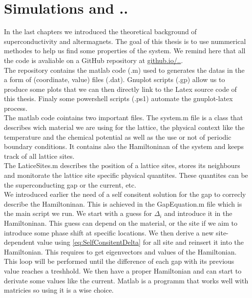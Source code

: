 \documentclass[../main.tex]{subfile}
\begin{document}
\section{Simulations and ..}
In the last chapters we introduced the theoretical background of superconductivity and altermagnets. 
The goal of this thesis is to use nummerical methodes to help us find some properties of the system.
We remind here that all the code is avaliable on a GitHub repository at \url{github.io/..}. \\

The repository contains the matlab code (.m) used to generates the datas in the a form of (coordinate, value) files (.dat).
Gnuplot scripts (.gp) allow us to produce some plots that we can then directly link to the Latex source code
of this thesis. Finaly some powershell scripts (.ps1) automate the gnuplot-latex process.\\

The matlab code cointains two important files. The system.m file is a class that describes wich
 material we are using for the lattice, the physical context like the temperature and the chemical potential
as well as the use or not of periodic boundary conditions. It contains also the Hamiltoninan of the system
and keeps track of all lattice sites.\\
The LaticeSites.m describes the position of a lattice sites, stores its neighbours and monitorate the lattice
site specific physical quantites. These quantites can be the superconducting gap or the current, etc.\\

We introduced earlier the need of a self consitent solution for the gap to correcly describe the Hamiltoninan.
This is achieved in the GapEquation.m file which is the main script we run. We start with a guess for
$\Delta_i$ and introduce it in the Hamiltoninan. This guess can depend on the material, or the site 
if we aim to introduce some phase shift at specific locations.
We then derive a new site-dependent value using \ref{eq:SelfConsitentDelta} for all site and
reinsert it into the Hamiltonian. This requires to get eigenvectors and values of the Hamiltonian. This loop will be 
performed until the difference of each gap with its previous value reaches a treshhold. We then have a proper 
Hamiltonian and can start to derivate some values like the current. 
Matlab is a programm that works well with matricies so using it is a wise choice.\\
\end{document}
